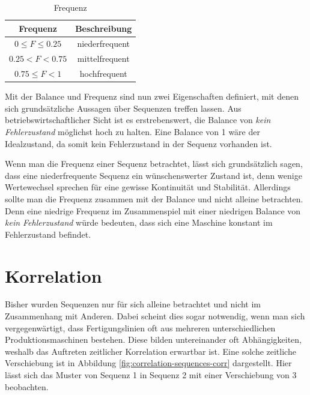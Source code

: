 \begin{table}[H]
	\begin{center}
		\begin{tabular}{|c c|} 
			\hline
			Frequenz & Beschreibung \\
			\hline\hline
			$0 \leq F \leq 0.25$ & niederfrequent \\ 
			\hline
			$0.25 < F < 0.75$ & mittelfrequent \\
			\hline
			$0.75 \leq F < 1$ & hochfrequent \\
			\hline
		\end{tabular}
		\caption{Frequenz}
		\label{tab:properties-frequency}
	\end{center}
\end{table}

Mit der Balance und Frequenz sind nun zwei Eigenschaften definiert, mit denen sich grundsätzliche Aussagen über Sequenzen treffen lassen. Aus betriebswirtschaftlicher Sicht ist es erstrebenswert, die Balance von \textit{kein Fehlerzustand} möglichst hoch zu halten. Eine Balance von 1 wäre der Idealzustand, da somit kein Fehlerzustand in der Sequenz vorhanden ist. 

Wenn man die Frequenz einer Sequenz betrachtet, lässt sich grundsätzlich sagen, dass eine niederfrequente Sequenz ein wünschenswerter Zustand ist, denn wenige Wertewechsel sprechen für eine gewisse Kontinuität und Stabilität. Allerdings sollte man die Frequenz zusammen mit der Balance und nicht alleine betrachten. Denn eine niedrige Frequenz im Zusammenspiel mit einer niedrigen Balance von \textit{kein Fehlerzustand} würde bedeuten, dass sich eine Maschine konstant im Fehlerzustand befindet.

\section{Korrelation}
\label{chp:correlation-sequences}
Bisher wurden Sequenzen nur für sich alleine betrachtet und nicht im Zusammenhang mit Anderen. Dabei scheint dies sogar notwendig, wenn man sich vergegenwärtigt, dass Fertigungslinien oft aus mehreren unterschiedlichen Produktionsmaschinen bestehen. Diese bilden untereinander oft Abhängigkeiten, weshalb das Auftreten zeitlicher Korrelation erwartbar ist. Eine solche zeitliche Verschiebung ist in Abbildung \ref{fig:correlation-sequences-corr} dargestellt. Hier lässt sich das Muster von Sequenz 1 in Sequenz 2 mit einer Verschiebung von 3 beobachten.  

